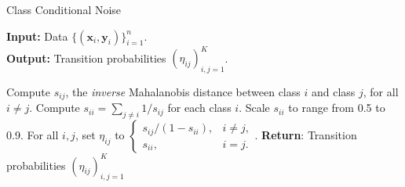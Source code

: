 \documentclass[letterpaper]{article} %
\newcommand{\bx}{{\bm{x}}}
\newcommand{\by}{{\bm{y}}}
\begin{document}



\begin{algorithm}[h]
\caption{Class Conditional Noise}
\label{alg:ccn}
\textbf{Input:} Data $\{(\bx_i,\by_i)\}_{i=1}^n$.\\
\textbf{Output:} Transition probabilities $(\eta_{ij})_{i,j=1}^K$.

\begin{algorithmic}[1]
\STATE Compute $s_{ij}$, the \emph{inverse} Mahalanobis distance between class $i$ and class $j$, for all $i \neq j$.
\STATE Compute $s_{ii} = \sum_{j \neq i} 1/s_{ij}$ for each class $i$.
\STATE Scale $s_{ii}$ to range from 0.5 to 0.9.
\STATE For all $i, j$, set $\eta_{ij}$ to $\begin{cases}
    s_{ij}/(1 - s_{ii}),  & i \neq j,\\
    s_{ii}, & i = j.
    \end{cases}$.
\STATE \textbf{Return}: Transition probabilities $(\eta_{ij})_{i,j=1}^K$
\end{algorithmic}
\end{algorithm}
\end{document}
